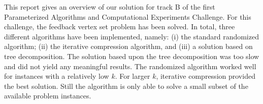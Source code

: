 This report gives an overview of our solution for track B of the first Parameterized Algorithms and Computational Experiments Challenge. For this challenge, the feedback vertex set problem has been solved. In total, three different algorithms have been implemented, namely: (i) the standard randomized algorithm; (ii) the iterative compression algorithm, and (iii) a solution based on tree decomposition. The solution based upon the tree decomposition was too slow and did not yield any meaningful results. The randomized algorithm worked well for instances with a relatively low $k$.  For larger $k$, iterative compression provided the best solution. Still the algorithm is only able to solve a small subset of the available problem instances. 